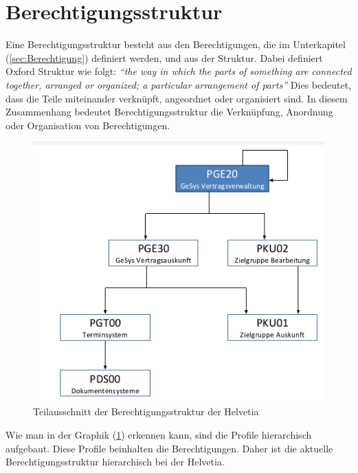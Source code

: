 \section{Berechtigungsstruktur}
\label{sec:Berechtigungsstruktur}
Eine Berechtigungsstruktur besteht aus den Berechtigungen, die im Unterkapitel (\ref{sec:Berechtigung}) definiert werden, und aus der Struktur.
Dabei definiert Oxford Struktur wie folgt:
\newline
\newline
\textit{"`the way in which the parts of something are connected together, arranged or organized; a particular arrangement of parts"'} \cite{Struct}
\newline
\newline
Dies bedeutet, dass die Teile miteinander verknüpft, angeordnet oder organisiert sind. \cite{Struct}
\newline
In diesem Zusammenhang bedeutet Berechtigungsstruktur die Verknüpfung, Anordnung oder Organisation von Berechtigungen.
\begin{figure}[h!]
 \centering
 \includegraphics[width=1\textwidth]{gfx/Picture/Struktur.PNG}
 \caption{Teilausschnitt der Berechtigungsstruktur der Helvetia}
 \label{fig:Teil}
\end{figure}
Wie man in der Graphik (\ref{fig:Teil}) erkennen kann, sind die Profile hierarchisch aufgebaut.
Diese Profile beinhalten die Berechtigungen.
Daher ist die aktuelle Berechtigungsstruktur hierarchisch bei der Helvetia.



